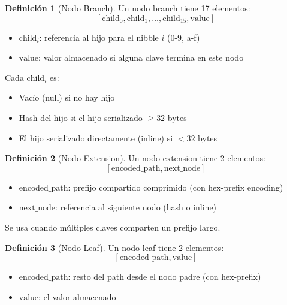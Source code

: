 \documentclass[11pt,a4paper,twoside,openright]{book}
\theoremstyle{definition}
\newtheorem{definition}{Definición}[chapter]
\theoremstyle{plain}
\theoremstyle{remark}
\begin{document}
\begin{definition}[Nodo Branch]
Un nodo branch tiene 17 elementos:
\[ [\text{child}_0, \text{child}_1, \ldots, \text{child}_{15}, \text{value}] \]

\begin{itemize}
    \item $\text{child}_i$: referencia al hijo para el nibble $i$ (0-9, a-f)
    \item $\text{value}$: valor almacenado si alguna clave termina en este nodo
\end{itemize}

Cada $\text{child}_i$ es:
\begin{itemize}
    \item Vacío (null) si no hay hijo
    \item Hash del hijo si el hijo serializado $\geq 32$ bytes
    \item El hijo serializado directamente (inline) si $< 32$ bytes
\end{itemize}
\end{definition}

\begin{definition}[Nodo Extension]
Un nodo extension tiene 2 elementos:
\[ [\text{encoded\_path}, \text{next\_node}] \]

\begin{itemize}
    \item $\text{encoded\_path}$: prefijo compartido comprimido (con hex-prefix encoding)
    \item $\text{next\_node}$: referencia al siguiente nodo (hash o inline)
\end{itemize}

Se usa cuando múltiples claves comparten un prefijo largo.
\end{definition}

\begin{definition}[Nodo Leaf]
Un nodo leaf tiene 2 elementos:
\[ [\text{encoded\_path}, \text{value}] \]

\begin{itemize}
    \item $\text{encoded\_path}$: resto del path desde el nodo padre (con hex-prefix)
    \item $\text{value}$: el valor almacenado
\end{itemize}
\end{definition}
\end{document}

